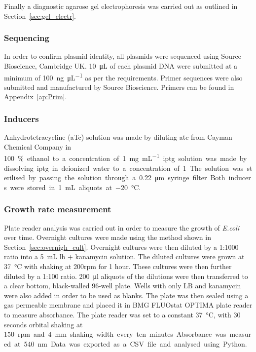 Finally a diagnostic agarose gel electrophoresis was carried out as outlined in Section~\ref{sec:gel_electr}.

\subsubsection{Sequencing}
In order to confirm plasmid identity, all plasmids were sequenced using Source Bioscience, Cambridge UK. \SI{10}{\micro\liter}  of each plasmid DNA were submitted at a minimum of \SI{100}{\nano\gram\per\micro\liter} as per the requirements. Primer sequences were also submitted and manufactured by Source Bioscience. Primers can be found in Appendix~\ref{ap:Prim}. 

\subsubsection{Inducers}

Anhydrotetracycline (aTc) solution was made by diluting \acrshort{atc} from Cayman Chemical Company in \SI{100}\% ethanol to a concentration of \SI{1}{\milli\gram\per\milli\liter}. \acrfull{iptg} solution was made by dissolving \acrshort{iptg} in deionized water to a concentration of \SI{1}{\molar}. The solution was sterilised by passing the solution through a \SI{0.22}{\micro\meter} syringe filter. Both inducers were stored in \SI{1}{\milli\liter} aliquots at \SI{-20}{\celsius}. 


\subsubsection{Growth rate measurement}
\label{sec:growth_meth}
Plate reader analysis was carried out in order to measure the growth of \textit{E.coli} over time. Overnight cultures were made using the method shown in Section~\ref{sec:overnigh_cult}. Overnight cultures were then diluted by a 1:1000 ratio into a \SI{5}{\milli\liter} \acrshort{lb} + kanamycin solution. The diluted cultures were grown at \SI{37}{\celsius} with shaking at 200rpm for 1 hour. These cultures were then further diluted by a 1:100 ratio. \SI{200}{\ul} aliquots of the dilutions were then transferred to a clear bottom, black-walled 96-well plate. Wells with only LB and kanamycin were also added in order to be used as blanks. The plate was then sealed using a gas permeable membrane and placed it in BMG FLUOstat OPTIMA plate reader to measure absorbance. The plate reader was set to a constant \SI{37}{\celsius}, with 30 seconds orbital shaking at \SI{150}rpm and \SI{4}{\milli\metre} shaking width every ten minutes. Absorbance was measured at \SI{540}{\nano\meter}. Data was exported as a CSV file and analysed using Python. 

